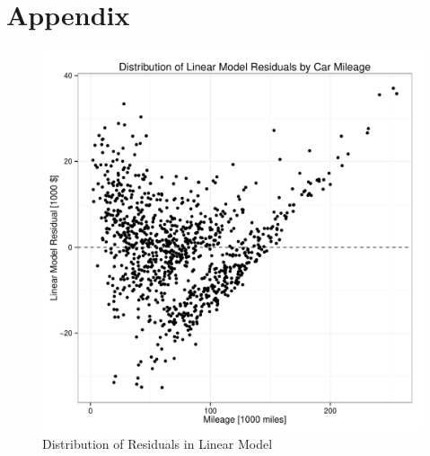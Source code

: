 \documentclass[11pt, fleqn, titlepage]{article}
\begin{document}
\section{Appendix}

\begin{figure}[!htb]
  \centering
  \includegraphics[scale=.5]{lin_errors.pdf}
  \caption{Distribution of Residuals in Linear Model}
  \label{fig:lin_errors}
\end{figure}
\end{document}
